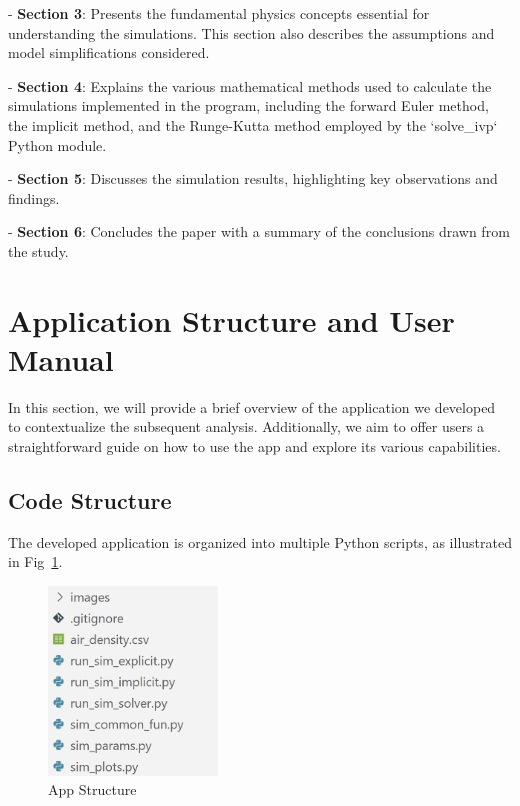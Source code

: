 \documentclass[runningheads]{llncs}
\begin{document}
- \textbf{Section 3}: Presents the fundamental physics concepts essential for understanding the simulations. This section also describes the assumptions and model simplifications considered.

- \textbf{Section 4}: Explains the various mathematical methods used to calculate the simulations implemented in the program, including the forward Euler method, the implicit method, and the Runge-Kutta method employed by the `solve\_ivp` Python module.

- \textbf{Section 5}: Discusses the simulation results, highlighting key observations and findings.

- \textbf{Section 6}: Concludes the paper with a summary of the conclusions drawn from the study.




\section{Application Structure and User Manual}
In this section, we will provide a brief overview of the application we developed to contextualize the subsequent analysis. Additionally, we aim to offer users a straightforward guide on how to use the app and explore its various capabilities.

\subsection{Code Structure}
The developed application \cite{git} is organized into multiple Python scripts, as illustrated in Fig~\ref{app_structure}.

\begin{figure}
\centering
\includegraphics[width=0.4\textwidth]{images/app_structure.png}
\caption{App Structure \cite{git}} \label{app_structure}
\end{figure}
\end{document}
